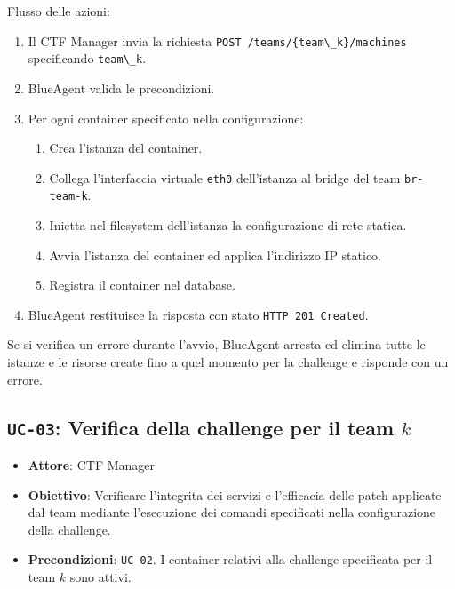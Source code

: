 Flusso delle azioni:

\begin{enumerate}
\def\labelenumi{\arabic{enumi}.}
\tightlist
\item
  Il CTF Manager invia la richiesta
  \passthrough{\lstinline!POST /teams/\{team\_k\}/machines!}
  specificando \passthrough{\lstinline!team\_k!}.
\item
  BlueAgent valida le precondizioni.
\item
  Per ogni container specificato nella configurazione:

  \begin{enumerate}
  \def\labelenumii{\arabic{enumii}.}
  \tightlist
  \item
    Crea l'istanza del container.
  \item
    Collega l'interfaccia virtuale \passthrough{\lstinline!eth0!}
    dell'istanza al bridge del team \passthrough{\lstinline!br-team-k!}.
  \item
    Inietta nel filesystem dell'istanza la configurazione di rete
    statica.
  \item
    Avvia l'istanza del container ed applica l'indirizzo IP statico.
  \item
    Registra il container nel database.
  \end{enumerate}
\item
  BlueAgent restituisce la risposta con stato
  \passthrough{\lstinline!HTTP 201 Created!}.
\end{enumerate}

Se si verifica un errore durante l'avvio, BlueAgent arresta ed elimina
tutte le istanze e le risorse create fino a quel momento per la
challenge e risponde con un errore.

\subsection{\texorpdfstring{\texttt{UC-03}: Verifica della challenge per
il team
\(k\)}{UC-03: Verifica della challenge per il team k}}\label{uc-03-verifica-della-challenge-per-il-team-k}

\begin{itemize}
\tightlist
\item
  \textbf{Attore}: CTF Manager
\item
  \textbf{Obiettivo}: Verificare l'integrita dei servizi e l'efficacia
  delle patch applicate dal team mediante l'esecuzione dei comandi
  specificati nella configurazione della challenge.
\item
  \textbf{Precondizioni}: \passthrough{\lstinline!UC-02!}. I container
  relativi alla challenge specificata per il team \(k\) sono attivi.
\end{itemize}

